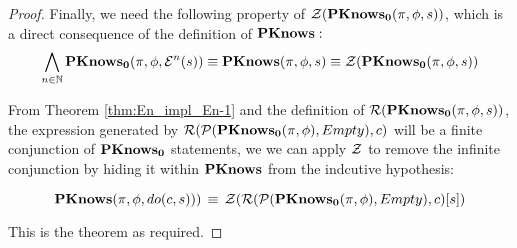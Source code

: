 \begin{proof}
Finally, we need the following property of $\mathcal{Z}(\mathbf{PKnows_{0}}(\pi,\phi,s))$,
which is a direct consequence of the definition of $\mathbf{PKnows}:$\[
\bigwedge_{n\in\mathbb{N}}\mathbf{PKnows_{0}}(\pi,\phi,\mathcal{E}^{n}(s))\equiv\mathbf{PKnows}(\pi,\phi,s)\equiv\mathcal{Z}(\mathbf{PKnows_{0}}(\pi,\phi,s))\]


From Theorem \ref{thm:En_impl_En-1} and the definition of $\mathcal{R}(\mathbf{PKnows_{0}}(\pi,\phi,s))$,
the expression generated by $\mathcal{R}(\mathcal{P}(\mathbf{PKnows_{0}}(\pi,\phi),Empty),c)$
will be a finite conjunction of $\mathbf{PKnows_{0}}$ statements, we we can
apply $\mathcal{Z}$ to remove the infinite conjunction by hiding it within
$\mathbf{PKnows}$ from the indcutive hypothesis:

\[
\mathbf{PKnows}(\pi,\phi,do(c,s)))\,\equiv\,\mathcal{Z}(\mathcal{R}(\mathcal{P}(\mathbf{PKnows_{0}}(\pi,\phi),Empty),c)[s])\]


This is the theorem as required.
\end{proof}
\medskip{}


